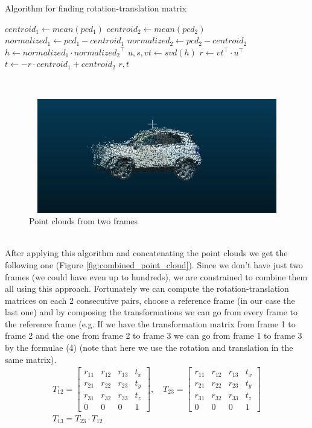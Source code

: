 \documentclass{article}
\begin{document}
\begin{algorithm}
\caption{Algorithm for finding rotation-translation matrix}\label{alg:cap}
\begin{algorithmic}
\State $centroid_1 \gets mean(pcd_1)$
\State $centroid_2 \gets mean(pcd_2)$
\State $normalized_1 \gets pcd_1 - centroid_1$
\State $normalized_2 \gets pcd_2 - centroid_2$
\State $h \gets normalized_1 \cdot {normalized_2}^\intercal$ 
\State $u, s, vt \gets svd(h)$
\State $r \gets {vt}^\intercal \cdot {u}^\intercal$
\State $t \gets -r \cdot centroid_1 + centroid_2$
\State \Return $r, t$
\end{algorithmic}
\end{algorithm}\\
\begin{figure}[!ht]
\includegraphics[width=12cm,height=5cm,keepaspectratio]{images/two_point_clouds.png}
\caption{Point clouds from two frames}
\label{fig:two_point_clouds}
\end{figure}\\
\tab \tab After applying this algorithm and concatenating the point clouds we get the following one (Figure \ref{fig:combined_point_cloud}). Since we don't have just two frames (we could have even up to hundreds), we are constrained to combine them all using this approach. Fortunately we can compute the rotation-translation matrices on each 2 consecutive pairs, choose a reference frame (in our case the last one) and by composing the transformations we can go from every frame to the reference frame (e.g. If we have the transformation matrix from frame 1 to frame 2 and the one from frame 2 to frame 3 we can go from frame 1 to frame 3 by the formulae (4) (note that here we use the rotation and translation in the same matrix).\\
\begin{gather}
\label{eqn:composing_rotation}
T_{12} = \begin{bmatrix}
    r_{11} & r_{12} & r_{13} & t_x \\
    r_{21} & r_{22} & r_{23} & t_y \\
    r_{31} & r_{32} & r_{33} & t_z \\
    0 & 0 & 0 & 1
\end{bmatrix} , \quad
T_{23} = \begin{bmatrix}
    r_{11} & r_{12} & r_{13} & t_x \\
    r_{21} & r_{22} & r_{23} & t_y \\
    r_{31} & r_{32} & r_{33} & t_z \\
    0 & 0 & 0 & 1
\end{bmatrix} \\
T_{13} = T_{23} \cdot T_{12}
\end{gather}
\end{document}
